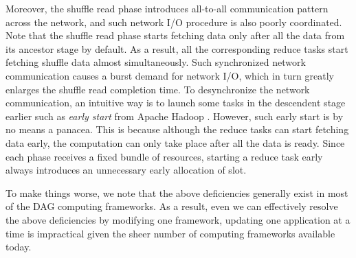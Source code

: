 Moreover, the shuffle read phase introduces all-to-all communication pattern across the network, and such network I/O procedure is also poorly coordinated.
Note that the shuffle read phase starts fetching data only after all the data from its ancestor stage by default. As a result, all the corresponding reduce tasks start fetching shuffle data almost simultaneously.
Such synchronized network communication causes a burst demand for network I/O, which in turn greatly enlarges the shuffle read completion time. To desynchronize the network communication, an intuitive way is to launch some tasks in the descendent stage earlier such as \textit{early start} from Apache Hadoop \cite{hadoop}. However, such early start is by no means a panacea. This is because although the reduce tasks can start fetching data early, the computation can only take place after all the data is ready. Since each phase receives a fixed bundle of resources, starting a reduce task early always introduces an unnecessary early allocation of slot.



To make things worse, we note that the above deficiencies generally exist in most of the DAG computing frameworks. As a result, even we can effectively resolve the above deficiencies by modifying one framework, updating one application at a time is impractical given the sheer number of computing frameworks available today.

